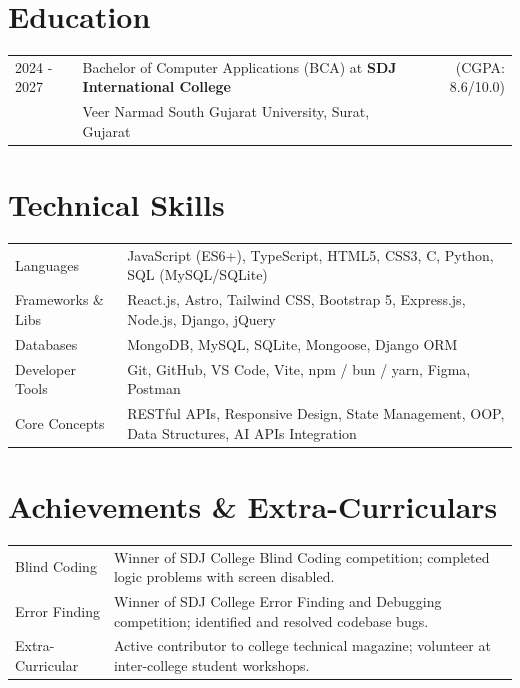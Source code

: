 \documentclass[a4paper,10pt]{article}
\begin{document}
\section{Education}
\begin{tabularx}{\linewidth}{@{}l X r@{}}	
2024 - 2027 & Bachelor of Computer Applications (BCA) at \textbf{SDJ International College} & (CGPA: 8.6/10.0) \\
 & Veer Narmad South Gujarat University, Surat, Gujarat & \\
\end{tabularx}

\section{Technical Skills}
\begin{tabularx}{\linewidth}{@{}l X@{}}
Languages & JavaScript (ES6+), TypeScript, HTML5, CSS3, C, Python, SQL (MySQL/SQLite) \\
Frameworks \& Libs & React.js, Astro, Tailwind CSS, Bootstrap 5, Express.js, Node.js, Django, jQuery \\
Databases & MongoDB, MySQL, SQLite, Mongoose, Django ORM \\
Developer Tools & Git, GitHub, VS Code, Vite, npm / bun / yarn, Figma, Postman \\
Core Concepts & RESTful APIs, Responsive Design, State Management, OOP, Data Structures, AI APIs Integration
\end{tabularx}

\section{Achievements \& Extra-Curriculars}
\begin{tabularx}{\linewidth}{@{}l X@{}}
Blind Coding & Winner of SDJ College Blind Coding competition; completed logic problems with screen disabled. \\
Error Finding & Winner of SDJ College Error Finding and Debugging competition; identified and resolved codebase bugs. \\
Extra-Curricular & Active contributor to college technical magazine; volunteer at inter-college student workshops.
\end{tabularx}
\end{document}
